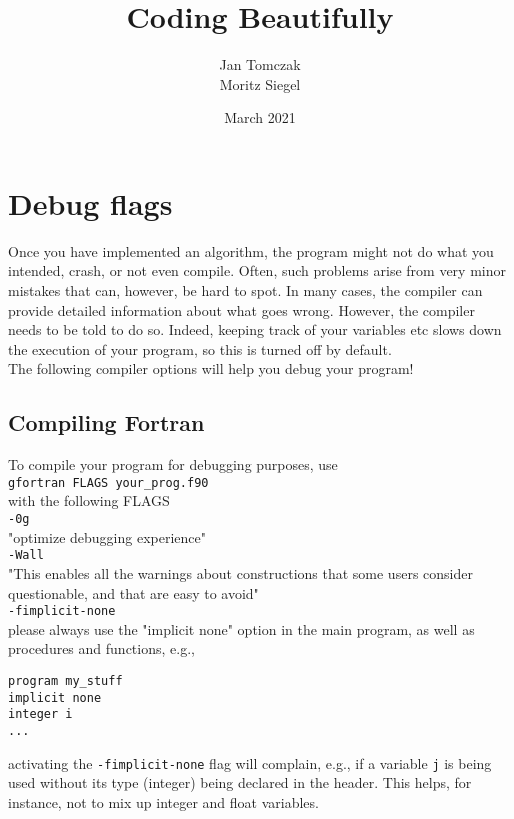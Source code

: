 \documentclass{article}
\title{Coding Beautifully}
\date{March 2021}
\author{Jan Tomczak\\Moritz Siegel}
\begin{document}
\maketitle

\section{Debug flags}

Once you have implemented an algorithm, the program might not do what you intended, crash, or not even compile.
Often, such problems arise from very minor mistakes that can, however, be hard to spot.
In many cases, the compiler can provide detailed information about what goes wrong. 
However, the compiler needs to be told to do so. Indeed, keeping track of your variables etc slows down the execution of your program, so this is turned off by default.\\

\noindent
The following compiler options will help you debug your program!

\subsection{Compiling Fortran}

To compile your program for debugging purposes, use\\

\verb|gfortran FLAGS your_prog.f90|\\

\noindent
with the following FLAGS\\

\verb|-0g|\\   
"optimize debugging experience" \\

\verb|-Wall|\\  
"This enables all the warnings about constructions that some users consider questionable, and that are easy to avoid"\\

\verb|-fimplicit-none|\\
please always use the "implicit none" option in the main program, as well as procedures and functions, e.g.,


\begin{verbatim}
program my_stuff
implicit none
integer i
...
\end{verbatim}

\noindent
activating the \verb|-fimplicit-none| flag will complain, e.g., if a variable \verb|j| is being used without
its type (integer) being declared in the header. This helps, for instance, not to mix up integer and float variables.\\
\end{document}
